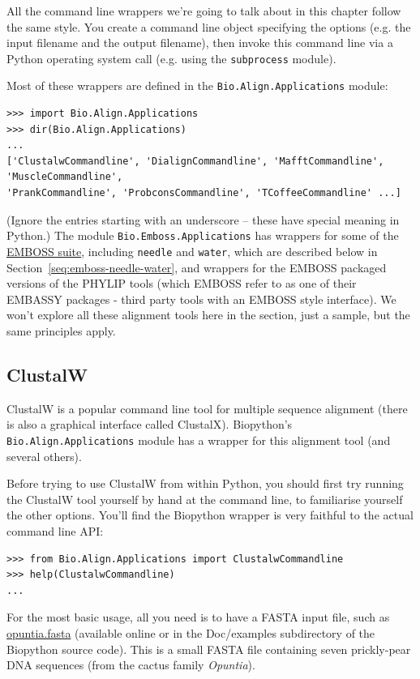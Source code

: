 \documentclass{report}
\begin{document}
All the command line wrappers we're going to talk about in this chapter follow the same style.
You create a command line object specifying the options (e.g. the input filename and the
output filename), then invoke this command line via a Python operating system call (e.g.
using the \texttt{subprocess} module).

Most of these wrappers are defined in the \verb|Bio.Align.Applications| module:

\begin{verbatim}
>>> import Bio.Align.Applications
>>> dir(Bio.Align.Applications)
...
['ClustalwCommandline', 'DialignCommandline', 'MafftCommandline', 'MuscleCommandline',
'PrankCommandline', 'ProbconsCommandline', 'TCoffeeCommandline' ...]
\end{verbatim}

\noindent (Ignore the entries starting with an underscore -- these have
special meaning in Python.)
The module \verb|Bio.Emboss.Applications| has wrappers for some of the
\href{http://emboss.sourceforge.net/}{EMBOSS suite}, including
\texttt{needle} and \texttt{water}, which are described below in
Section~\ref{seq:emboss-needle-water}, and wrappers for the EMBOSS
packaged versions of the PHYLIP tools (which EMBOSS refer to as one
of their EMBASSY packages - third party tools with an EMBOSS style
interface).
We won't explore all these alignment tools here in the section, just a
sample, but the same principles apply.

\subsection{ClustalW}
\label{sec:align_clustal}
ClustalW is a popular command line tool for multiple sequence alignment
(there is also a graphical interface called ClustalX). Biopython's
\verb|Bio.Align.Applications| module has a wrapper for this alignment tool
(and several others).

Before trying to use ClustalW from within Python, you should first try running
the ClustalW tool yourself by hand at the command line, to familiarise
yourself the other options. You'll find the Biopython wrapper is very
faithful to the actual command line API:

\begin{verbatim}
>>> from Bio.Align.Applications import ClustalwCommandline
>>> help(ClustalwCommandline)
...
\end{verbatim}

For the most basic usage, all you need is to have a FASTA input file, such as
\href{http://biopython.org/DIST/docs/tutorial/examples/opuntia.fasta}{opuntia.fasta}
(available online or in the Doc/examples subdirectory of the Biopython source
code). This is a small FASTA file containing seven prickly-pear DNA sequences
(from the cactus family \textit{Opuntia}).
\end{document}

